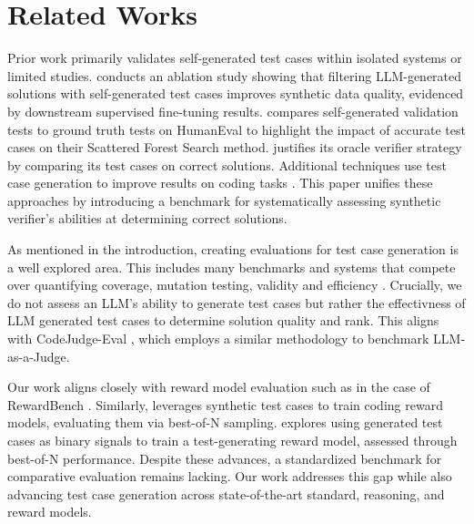 \section{Related Works}
\label{sec:related_works}

Prior work primarily validates self-generated test cases within isolated systems or limited studies. \cite{selfcodealign} conducts an ablation study showing that filtering LLM-generated solutions with self-generated test cases improves synthetic data quality, evidenced by downstream supervised fine-tuning results. \cite{scatteredforest} compares self-generated validation tests to ground truth tests on HumanEval to highlight the impact of accurate test cases on their Scattered Forest Search method. \cite{algo} justifies its oracle verifier strategy by comparing its test cases on correct solutions. Additional techniques use test case generation to improve results on coding tasks \citep{dstc, alphacodium, code_optimization, proces_supervised_rl}.  This paper unifies these approaches by introducing a benchmark for systematically assessing synthetic verifier's abilities at determining correct solutions.

As mentioned in the introduction, creating evaluations for test case generation is a well explored area. This includes many benchmarks and systems that compete over quantifying coverage, mutation testing, validity and efficiency \citep{testeval, testgeneval, swtbench, r2e, valtest, tddbench, coffee, codeaware, testcasegenerators, testbench}. Crucially, we do not assess an LLM's ability to generate test cases but rather the effectivness of LLM generated test cases to determine solution quality and rank. This aligns with CodeJudge-Eval \cite{codejudgeeval}, which employs a similar methodology to benchmark LLM-as-a-Judge.

Our work aligns closely with reward model evaluation such as in the case of RewardBench \citep{rewardbench}. Similarly, \cite{acecoder} leverages synthetic test cases to train coding reward models, evaluating them via best-of-N sampling. \cite{dynamic_scaling} explores using generated test cases as binary signals to train a test-generating reward model, assessed through best-of-N performance. Despite these advances, a standardized benchmark for comparative evaluation remains lacking. Our work addresses this gap while also advancing test case generation across state-of-the-art standard, reasoning, and reward models.






